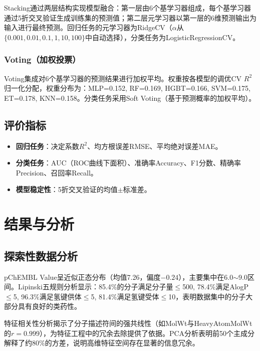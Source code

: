 \documentclass[12pt,a4paper]{article}
\begin{document}
Stacking通过两层结构实现模型融合：第一层由6个基学习器组成，每个基学习器通过5折交叉验证生成训练集的预测值；第二层元学习器以第一层的6维预测输出为输入进行最终预测。回归任务的元学习器为RidgeCV（$\alpha$从$\{0.001, 0.01, 0.1, 1, 10, 100\}$中自动选择），分类任务为LogisticRegressionCV。

\subsubsection{Voting（加权投票）}

Voting集成对6个基学习器的预测结果进行加权平均。权重按各模型的调优CV $R^2$归一化分配，权重分布为：MLP=0.152, RF=0.169, HGBT=0.166, SVM=0.175, ET=0.178, KNN=0.158。分类任务采用Soft Voting（基于预测概率的加权平均）。

\subsection{评价指标}

\begin{itemize}[leftmargin=2em]
    \item \textbf{回归任务}：决定系数$R^2$、均方根误差RMSE、平均绝对误差MAE。
    \item \textbf{分类任务}：AUC（ROC曲线下面积）、准确率Accuracy、F1分数、精确率Precision、召回率Recall。
    \item \textbf{模型稳定性}：5折交叉验证的均值$\pm$标准差。
\end{itemize}

\section{结果与分析}

\subsection{探索性数据分析}

pChEMBL Value呈近似正态分布（均值7.26，偏度$-0.24$），主要集中在6.0$\sim$9.0区间。Lipinski五规则分析显示：85.4\%的分子满足分子量$\leq$500, 78.4\%满足AlogP$\leq$5, 96.3\%满足氢键供体$\leq$5, 81.4\%满足氢键受体$\leq$10，表明数据集中的分子大部分具有良好的类药性。

特征相关性分析揭示了分子描述符间的强共线性（如MolWt与HeavyAtomMolWt的$r=0.999$），为特征工程中的冗余去除提供了依据。PCA分析表明前50个主成分解释了约80\%的方差，说明高维特征空间存在显著的信息冗余。
\end{document}
